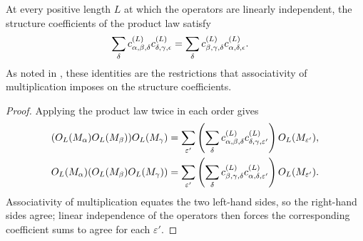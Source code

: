 \begin{lemma}%
    \label{thm:mpdo_bnt_label_coeff_associativity}
    \leanok
    At every positive length $L$ at which the operators are linearly
    independent, the structure coefficients of the product law
    satisfy
    \begin{align}
        \sum_\delta
        c^{(L)}_{\alpha,\beta,\delta}
        c^{(L)}_{\delta,\gamma,\epsilon}
         & =
        \sum_\delta
        c^{(L)}_{\beta,\gamma,\delta}
        c^{(L)}_{\alpha,\delta,\epsilon}.
        \notag
    \end{align}
    As noted in \cite[Section~4.5]{Cirac2016MPDO_arXiv}, these identities are
    the restrictions that associativity of multiplication imposes on the
    structure coefficients.
\end{lemma}
\begin{proof}\leanok
    Applying the product law twice in each order gives
    \begin{align}
        (O_L(M_\alpha)O_L(M_\beta))O_L(M_\gamma)
         & =
        \sum_{\varepsilon'}
        \left(\sum_\delta
        c^{(L)}_{\alpha,\beta,\delta}
        c^{(L)}_{\delta,\gamma,\varepsilon'}\right)
        O_L(M_{\varepsilon'}),
        \notag \\
        O_L(M_\alpha)(O_L(M_\beta)O_L(M_\gamma))
         & =
        \sum_{\varepsilon'}
        \left(\sum_\delta
        c^{(L)}_{\beta,\gamma,\delta}
        c^{(L)}_{\alpha,\delta,\varepsilon'}\right)
        O_L(M_{\varepsilon'}).
        \notag
    \end{align}
    Associativity of multiplication equates the two left-hand sides, so the
    right-hand sides agree; linear independence of the operators then forces
    the corresponding coefficient sums to agree for each $\varepsilon'$.
\end{proof}

